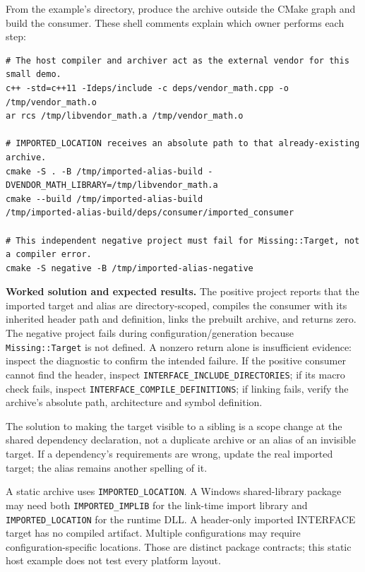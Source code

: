 From the example's directory, produce the archive outside the CMake graph and build the consumer. These shell comments explain which owner performs each step:

\begin{verbatim}
# The host compiler and archiver act as the external vendor for this small demo.
c++ -std=c++11 -Ideps/include -c deps/vendor_math.cpp -o /tmp/vendor_math.o
ar rcs /tmp/libvendor_math.a /tmp/vendor_math.o

# IMPORTED_LOCATION receives an absolute path to that already-existing archive.
cmake -S . -B /tmp/imported-alias-build -DVENDOR_MATH_LIBRARY=/tmp/libvendor_math.a
cmake --build /tmp/imported-alias-build
/tmp/imported-alias-build/deps/consumer/imported_consumer

# This independent negative project must fail for Missing::Target, not a compiler error.
cmake -S negative -B /tmp/imported-alias-negative
\end{verbatim}

\textbf{Worked solution and expected results.} The positive project reports that the imported target and alias are directory-scoped, compiles the consumer with its inherited header path and definition, links the prebuilt archive, and returns zero. The negative project fails during configuration/generation because \texttt{Missing::Target} is not defined. A nonzero return alone is insufficient evidence: inspect the diagnostic to confirm the intended failure. If the positive consumer cannot find the header, inspect \texttt{INTERFACE\_INCLUDE\_DIRECTORIES}; if its macro check fails, inspect \texttt{INTERFACE\_COMPILE\_DEFINITIONS}; if linking fails, verify the archive's absolute path, architecture and symbol definition.

The solution to making the target visible to a sibling is a scope change at the shared dependency declaration, not a duplicate archive or an alias of an invisible target. If a dependency's requirements are wrong, update the real imported target; the alias remains another spelling of it.

A static archive uses \texttt{IMPORTED\_LOCATION}. A Windows shared-library package may need both \texttt{IMPORTED\_IMPLIB} for the link-time import library and \texttt{IMPORTED\_LOCATION} for the runtime DLL. A header-only imported INTERFACE target has no compiled artifact. Multiple configurations may require configuration-specific locations. Those are distinct package contracts; this static host example does not test every platform layout.

